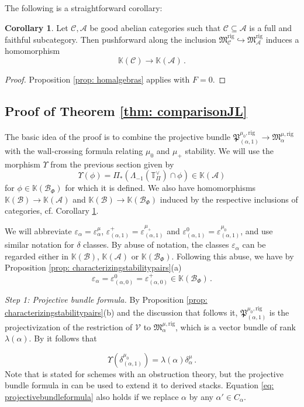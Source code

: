 \documentclass[12pt]{amsart}
\theoremstyle{definition}
\newtheorem{corollary}[definition]{Corollary}
\newcommand{\BK}{{\mathbb{K}}}
\newcommand{\BT}{{\mathbb{T}}}
\newcommand{\CA}{{\mathcal A}}
\newcommand{\CB}{{\mathcal B}}
\newcommand{\CC}{{\mathcal C}}
\newcommand{\CV}{{\mathcal V}}
\newcommand{\1}{\mathbf 1}
\newcommand{\FP}{{\mathfrak{P}}}
\newcommand{\FM}{{\mathfrak{M}}}
\newcommand{\rig}{\mathrm{rig}}
\begin{document}
The following is a straightforward corollary:

\begin{corollary}\label{cor: inclusionhomomorphism}
    Let $\CC, \CA$ be good abelian categories such that $\CC\subseteq \CA$ is a full and faithful subcategory. Then pushforward along the inclusion $\FM_{\CC}^\rig\hookrightarrow \FM_{\CA}^\rig$ induces a homomorphism
    \[\BK(\CC)\to \BK(\CA)\,.\]
\end{corollary}
\begin{proof}
    Proposition \ref{prop: homalgebras} applies with $F=0$. 
\end{proof}


\subsection{Proof of Theorem \ref{thm: comparisonJL}}
\label{subsec: proofcomparisonJL}

The basic idea of the proof is to combine the projective bundle $\FP_{(\alpha, 1)}^{\mu_0, \rig}\to \FM_\alpha^{\mu, \rig}$ with the wall-crossing formula relating $\mu_0$ and $\mu_+$ stability. We will use the morphism $\Upsilon$ from the previous section given by 
\[\Upsilon(\phi)= \Pi_\ast(\Lambda_{-1}(\BT_\Pi^\vee)\cap \phi)\in \BK(\CA)\]
for $\phi\in \BK(\CB_\Phi)$ for which it is defined. We also have homomorphisms $\BK(\CB)\to \BK(\CA)$ and $\BK(\CB)\to \BK(\CB_\Phi)$ induced by the respective inclusions of categories, cf. Corollary \ref{cor: inclusionhomomorphism}.

We will abbreviate $\varepsilon_\alpha=\varepsilon_\alpha^\mu$, $\varepsilon_{(\alpha, 1)}^+=\varepsilon_{(\alpha, 1)}^{\mu_+}$ and $\varepsilon_{(\alpha, 1)}^0=\varepsilon_{(\alpha, 1)}^{\mu_0}$, and use similar notation for $\delta$ classes. By abuse of notation, the classes $\varepsilon_\alpha$ can be regarded either in $\BK(\CB)$, $\BK(\CA)$ or $\BK(\CB_\Phi)$. Following this abuse, we have by Proposition \ref{prop: characterizingstabilitypairs}(a)
\[\varepsilon_\alpha=\varepsilon_{(\alpha,0)}^0=\varepsilon_{(\alpha, 0)}^+\in \BK(\CB_\Phi)\,.\]

\textit{Step 1: Projective bundle formula.} By Proposition \ref{prop: characterizingstabilitypairs}(b) and the discussion that follows it, $\FP_{(\alpha, 1)}^{\mu_0, \rig}$ is the projectivization of the restriction of $\CV$ to $\FM_\alpha^{\mu, \rig}$, which is a vector bundle of rank $\lambda(\alpha)$. By \cite[Lemma 2.1.16]{Liu} it follows that

\begin{equation}\label{eq: projectivebundleformula}
    \Upsilon(\delta_{(\alpha, 1)}^{\mu_0})=\lambda(\alpha)\delta_\alpha^{\mu}\,.
\end{equation}
Note that \cite[Lemma 2.1.16]{Liu} is stated for schemes with an obstruction theory, but the projective bundle formula in \cite[Propositions 3.1(iii), 3.2]{khan} can be used to extend it to derived stacks. Equation \eqref{eq: projectivebundleformula} also holds if we replace $\alpha$ by any $\alpha'\in C_\alpha$. 
\end{document}
